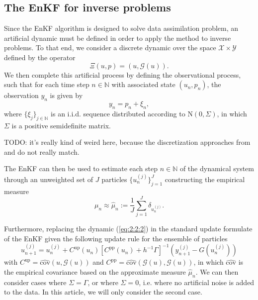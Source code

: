 \documentclass[a4paper,12pt]{elsarticle}
\begin{document}
\subsection{The EnKF for inverse problems} \label{subsec:2:2}
Since the EnKF algorithm is designed to solve data assimilation problem, an artificial dynamic must be
defined in order to apply the method to inverse problems. To that end, we consider a discrete dynamic
over the space $\mathcal{X} \times \mathcal{Y}$ defined by the operator
\begin{equation} \label{eq:2:2:1}
    \Xi(u, p) = (u, \mathcal{G}(u)).
\end{equation}
We then complete this artificial process by defining the observational process, such that for each
time step $n \in \mathbb{N}$ with associated state $(u_n, p_n)$, the observation $y_n$ is given by
\begin{equation} \label{eq:2:2:2}
    y_n = p_n + \xi_n,
\end{equation}
where $\{\xi_j\}_{j\in \mathbb{N}}$ is an i.i.d. sequence distributed according to $\text{N}(0, \Sigma)$,
in which $\Sigma$ is a positive semidefinite matrix.

TODO: it's really kind of weird here, because the discretization approaches from \cite{iglesias2013ensemble} and
\cite{schillings2017analysis} do not really match.

The EnKF can then be used to estimate each step $n \in \mathbb{N}$ of the dynamical system through an
unweighted set of $J$ particles $\{u_n^{(j)}\}_{j = 1}^J$ constructing the empirical measure
\begin{equation} \label{eq:2:2:3}
    \mu_n \approx \hat{\mu}_n := \frac1J\sum_{j=1}^J \delta_{u_n^{(j)}}.
\end{equation}

Furthermore, replacing the dynamic (\ref{eq:2:2:2}) in the standard update formulate of the EnKF given the
following update rule for the ensemble of particles
\begin{equation} \label{eq:2:2:4}
    u_{n+1}^{(j)} = u_{n}^{(j)} + C^{\text{up}}(u_n)[C^{\text{pp}}(u_n) + h^{-1}\Gamma]^{-1}(y_{n+1}^{(j)} - G(u_n^{(j)}))
\end{equation}
with $C^{\text{up}} = \hat{\text{cov}}(u, \mathcal{G}(u))$ and $C^{\text{pp}} = \hat{\text{cov}}(\mathcal{G}(u), \mathcal{G}(u))$,
in which $\hat{\text{cov}}$ is the empirical covariance based on the approximate measure $\hat{\mu}_n$.
We can then consider cases where $\Sigma = \Gamma$, or where $\Sigma = 0$, i.e. where no artificial noise
is added to the data. In this article, we will only consider the second case.
\end{document}
